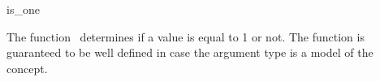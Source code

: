 \begin{ccRefFunction}{is_one}

\ccDefinition

The function \ccRefName\ determines if a value is equal to 1 or not.
The function is guaranteed to be well defined in case the argument type 
is a model of the  concept. 


 {}


\ccSeeAlso

\\
\\

\end{ccRefFunction}
